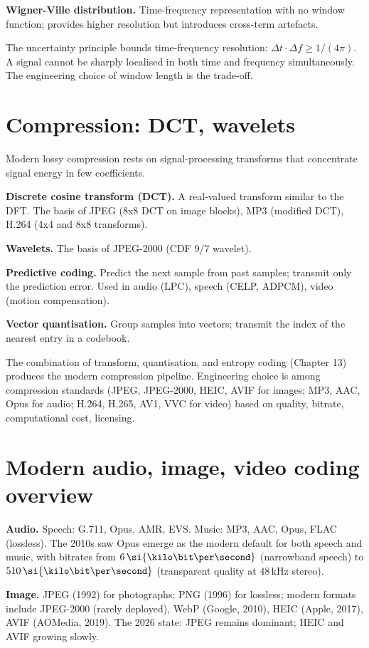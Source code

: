 \textbf{Wigner-Ville distribution.} Time-frequency representation with no window function; provides higher resolution but introduces cross-term artefacts.

The uncertainty principle bounds time-frequency resolution: $\Delta t \cdot \Delta f \geq 1/(4\pi)$. A signal cannot be sharply localised in both time and frequency simultaneously. The engineering choice of window length is the trade-off.

\section{Compression: DCT, wavelets}

Modern lossy compression rests on signal-processing transforms that concentrate signal energy in few coefficients.

\textbf{Discrete cosine transform (DCT).} A real-valued transform similar to the DFT. The basis of JPEG (8x8 DCT on image blocks), MP3 (modified DCT), H.264 (4x4 and 8x8 transforms).

\textbf{Wavelets.} The basis of JPEG-2000 (CDF 9/7 wavelet).

\textbf{Predictive coding.} Predict the next sample from past samples; transmit only the prediction error. Used in audio (LPC), speech (CELP, ADPCM), video (motion compensation).

\textbf{Vector quantisation.} Group samples into vectors; transmit the index of the nearest entry in a codebook.

The combination of transform, quantisation, and entropy coding (Chapter 13) produces the modern compression pipeline. Engineering choice is among compression standards (JPEG, JPEG-2000, HEIC, AVIF for images; MP3, AAC, Opus for audio; H.264, H.265, AV1, VVC for video) based on quality, bitrate, computational cost, licensing.

\section{Modern audio, image, video coding overview}

\textbf{Audio.} Speech: G.711, Opus, AMR, EVS. Music: MP3, AAC, Opus, FLAC (lossless). The 2010s saw Opus emerge as the modern default for both speech and music, with bitrates from $6\,\si{\kilo\bit\per\second}$ (narrowband speech) to $510\,\si{\kilo\bit\per\second}$ (transparent quality at $48\,\si{\kilo\hertz}$ stereo).

\textbf{Image.} JPEG (1992) for photographs; PNG (1996) for lossless; modern formats include JPEG-2000 (rarely deployed), WebP (Google, 2010), HEIC (Apple, 2017), AVIF (AOMedia, 2019). The 2026 state: JPEG remains dominant; HEIC and AVIF growing slowly.

